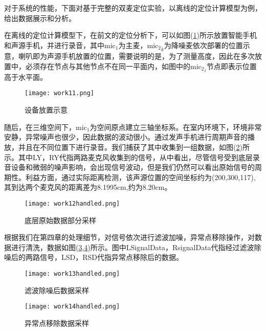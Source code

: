 \documentclass[winfonts,oneside]{njuthesis}
\begin{document}
		对于系统的性能，下面对基于完整的双麦定位实验，以离线的定位计算模型为例，给出数据展示和分析。
		
		在离线的定位计算模型下，在前文的定位分析下，可以如图(\ref{fig: work11})所示放置智能手机和声源手机，并进行录音，其中$\text{mic}_1$为主麦，${\text{mic}_2}_k$为降噪麦依次部署的位置示意，喇叭即为声源手机放置的位置，需要说明的是，为了测量高度，因此在多次放置中，必须存在节点与其他节点不在同一平面内，如图中的${\text{mic}_2}_i$节点即表示位置高于水平面。
			
		\begin{figure}[H]
			\centering
			\texttt{[image: work11.png]}
			\caption{设备放置示意}
			\label{fig: work11}
		\end{figure}
			
		随后，在三维空间下，$\text{mic}_1$为空间原点建立三轴坐标系。在室内环境下，环境非常安静，异常噪声也很少，因此数据的波动很小。通过发声手机进行周期声音的播放，并且在不同位置下进行录音。我们捕获了其中收集到一组数据，如图(\ref{fig: work12})所示。其中LY，RY代指两路麦克风收集到的信号，从中看出，尽管信号受到底层录音设备和微弱的噪声影响，会出现信号波动，但是我们仍然可以看出原始信号的周期性。利益方面，通过实际距离检测，该声源位置的空间坐标约为(200,300,117),其到达两个麦克风的距离差为8.1995cm,约为8.20cm。
			
		\begin{figure}[H]
			\centering
			\texttt{[image: work12handled.png]}
			\caption{底层原始数据部分采样}
			\label{fig: work12}
		\end{figure}
	
		根据我们在第四章的处理细节，对信号依次进行滤波加噪，异常点移除操作，对数据进行清洗，数据如图(\ref{fig: work13},\ref{fig: work14})所示。图中LSignalData，RsignalData代指经过滤波除噪后的两路信号，LSD，RSD代指异常点移除后的数据。
		
		\begin{figure}[H]
			\centering
			\texttt{[image: work13handled.png]}
			\caption{滤波除噪后数据采样}
			\label{fig: work13}
		\end{figure}
	
	
		\begin{figure}[H]
			\centering
			\texttt{[image: work14handled.png]}
			\caption{异常点移除数据采样}
			\label{fig: work14}
		\end{figure}
\end{document}
